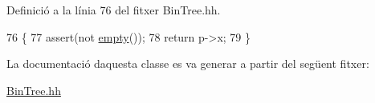 Definició a la línia 76 del fitxer Bin\+Tree.\+hh.


\begin{DoxyCode}
76                             \{
77         assert(not \hyperlink{class_bin_tree_a74cda259ba5c25b8ee38ed4dc33e4fad}{empty}());
78         \textcolor{keywordflow}{return} p->x;
79     \}
\end{DoxyCode}


La documentació d\textquotesingle{}aquesta classe es va generar a partir del següent fitxer\+:\begin{DoxyCompactItemize}
\item 
\hyperlink{_bin_tree_8hh}{Bin\+Tree.\+hh}\end{DoxyCompactItemize}
